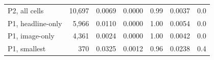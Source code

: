\begin{tabular}{lrrrrrr}
P2, all cells & 10,697 & 0.0069 & 0.0000 & 0.99 & 0.0037 & 0.0 \\
P1, headline-only & 5,966 & 0.0110 & 0.0000 & 1.00 & 0.0054 & 0.0 \\
P1, image-only & 4,361 & 0.0024 & 0.0000 & 1.00 & 0.0042 & 0.0 \\
P1, smallest & 370 & 0.0325 & 0.0012 & 0.96 & 0.0238 & 0.4 \\
\bottomrule
\end{tabular}
